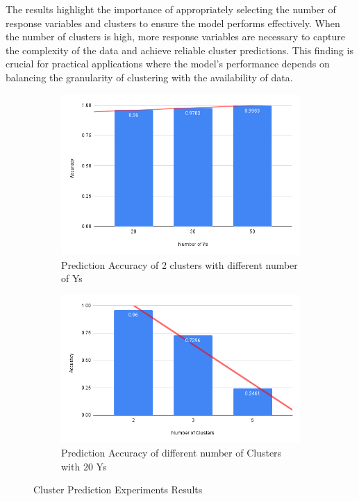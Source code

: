 \documentclass{article}
\begin{document}
The results highlight the importance of appropriately selecting the number of response variables and clusters to ensure the model performs effectively. 
When the number of clusters is high, more response variables are necessary to capture the complexity of the data and achieve reliable cluster predictions. 
This finding is crucial for practical applications where the model's performance depends on balancing the granularity of clustering with the availability of data.

\begin{figure}[htbp!]
  \centering
  \begin{subfigure}{0.49\textwidth}
      \centering
      \includegraphics[width=\textwidth]{images/experiments/dif_ys.png}
      \caption{Prediction Accuracy of 2 clusters with different number of Ys}
  \end{subfigure}
  \hfill
  \begin{subfigure}{0.49\textwidth}
      \centering
      \includegraphics[width=\textwidth]{images/experiments/exp_diff_clusters.png} %
      \caption{Prediction Accuracy of different number of Clusters with 20 Ys}
  \end{subfigure}
  \caption{Cluster Prediction Experiments Results}
  \label{fig:exp_res}
\end{figure}
\end{document}
